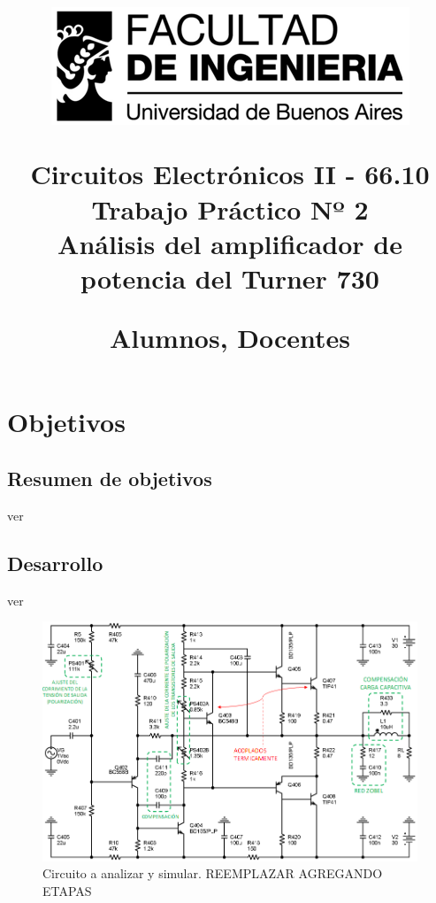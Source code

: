\documentclass[12pt]{book}
\begin{document}
\title{
\begin{center}
\includegraphics[scale=1]{figuras/cartelfiuba.png}\\[3cm]
\end{center}
Circuitos Electrónicos II - 66.10\\ Trabajo Práctico Nº 2\\[2cm]
Análisis del amplificador de potencia del Turner 730\\[1cm]
\begin{flushleft}
Alumnos, Docentes
\end{flushleft}}
\author{}
\date{}
\maketitle

\section{Objetivos}
\subsection{Resumen de objetivos}
ver
\subsection{Desarrollo}
ver

\newpage
\begin{figure}[!ht]
\centering
\includegraphics[scale=0.5]{figuras/CircuitoPropuesto.png}
\caption{Circuito a analizar y simular. REEMPLAZAR AGREGANDO ETAPAS}
\label{circuito}
\end{figure}
\end{document}
